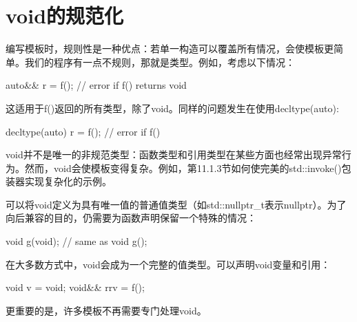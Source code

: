 \section{void的规范化}
编写模板时，规则性是一种优点：若单一构造可以覆盖所有情况，会使模板更简单。我们的程序有一点不规则，那就是类型。例如，考虑以下情况：

\begin{cpp}
auto&& r = f(); // error if f() returns void
\end{cpp}

这适用于f()返回的所有类型，除了void。同样的问题发生在使用decltype(auto):

\begin{cpp}
decltype(auto) r = f(); // error if f()
\end{cpp}

void并不是唯一的非规范类型：函数类型和引用类型在某些方面也经常出现异常行为。然而，void会使模板变得复杂。例如，第11.1.3节如何使完美的std::invoke()包装器实现复杂化的示例。

可以将void定义为具有唯一值的普通值类型（如std::nullptr\_t表示nullptr）。为了向后兼容的目的，仍需要为函数声明保留一个特殊的情况：

\begin{cpp}
void g(void); // same as void g();
\end{cpp}

在大多数方式中，void会成为一个完整的值类型。可以声明void变量和引用：

\begin{cpp}
void v = void{};
void&& rrv = f();
\end{cpp}

更重要的是，许多模板不再需要专门处理void。













































